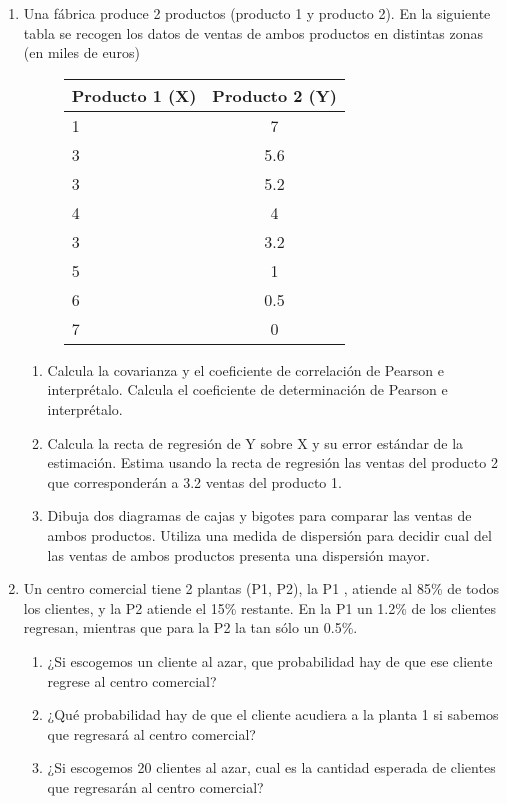 \documentclass[]{article}
\theoremstyle{plain}
\theoremstyle{definition}
\theoremstyle{definition} %
\begin{document}
\begin{enumerate}
  \item 
 
    Una fábrica produce 2 productos (producto 1 y producto 2). En la siguiente tabla se recogen los datos de ventas de ambos productos 
    en distintas zonas (en miles de euros)
    \begin{figure}
      \centering
      \begin{tabular}{lc}
        Producto 1 (X) & Producto 2 (Y)\\
        \hline
        1 & 7    \\
        3 & 5.6  \\  
        3 & 5.2     \\
        4 & 4  \\ 
        3 & 3.2    \\
        5 & 1  \\  
        6 & 0.5\\    
        7 & 0    
      \end{tabular}
    \end{figure}

    \begin{enumerate}
      \item
      Calcula la covarianza y el coeficiente de correlación de Pearson e
      interprétalo. Calcula el coeficiente de determinación de Pearson e interprétalo.
      
      \item
      Calcula la recta de regresión de Y sobre X y su error estándar de la estimación. 
      Estima usando la recta de regresión las ventas del producto 2 que corresponderán a 3.2 ventas del producto 1.

      \item Dibuja dos diagramas de cajas y bigotes para comparar las ventas de ambos productos. Utiliza una medida de dispersión para decidir
      cual del las ventas de ambos productos presenta una dispersión mayor.
    \end{enumerate}
 
  \item Un centro comercial tiene 2 plantas (P1, P2), la P1 , atiende
    al 85\% de todos los clientes, y la P2 atiende el 
    15\% restante. En la P1 un 1.2\% de los clientes regresan, mientras que para la P2 la tan sólo un 0.5\%.
    \begin{enumerate}
      \item ¿Si escogemos un cliente al azar, que probabilidad hay de que ese cliente regrese al centro comercial?
      \item ¿Qué probabilidad hay de que el cliente acudiera a la planta 1 si sabemos que regresará al centro comercial?
      \item ¿Si escogemos 20 clientes al azar, cual es la cantidad esperada de clientes que regresarán al centro comercial?
    \end{enumerate}
 


\end{enumerate}
\end{document}
